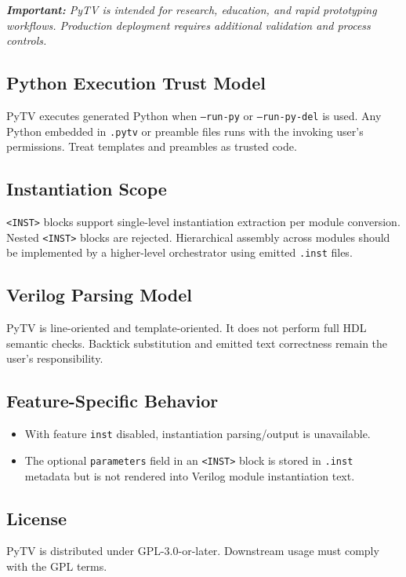 \textit{\textbf{Important:}
PyTV is intended for research, education, and rapid prototyping workflows.
Production deployment requires additional validation and process controls.}

\subsection{Python Execution Trust Model}
PyTV executes generated Python when \texttt{--run-py} or \texttt{--run-py-del} is used.
Any Python embedded in \texttt{.pytv} or preamble files runs with the invoking user's permissions.
Treat templates and preambles as trusted code.

\subsection{Instantiation Scope}
\texttt{<INST>} blocks support single-level instantiation extraction per module conversion.
Nested \texttt{<INST>} blocks are rejected.
Hierarchical assembly across modules should be implemented by a higher-level orchestrator using emitted \texttt{.inst} files.

\subsection{Verilog Parsing Model}
PyTV is line-oriented and template-oriented.
It does not perform full HDL semantic checks.
Backtick substitution and emitted text correctness remain the user's responsibility.

\subsection{Feature-Specific Behavior}
\begin{itemize}
  \item With feature \texttt{inst} disabled, instantiation parsing/output is unavailable.
  \item The optional \texttt{parameters} field in an \texttt{<INST>} block is stored in \texttt{.inst}
  metadata but is not rendered into Verilog module instantiation text.
\end{itemize}

\subsection{License}
PyTV is distributed under GPL-3.0-or-later.
Downstream usage must comply with the GPL terms.
